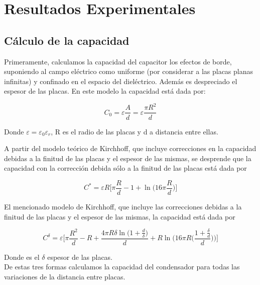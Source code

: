\documentclass{article}
\begin{document}
\section{Resultados Experimentales}

\subsection{Cálculo de la capacidad}
Primeramente, calculamos la capacidad del capacitor los efectos de borde, suponiendo al campo eléctrico como uniforme (por considerar a las 
placas planas infinitas) y confinado en el espacio del dieléctrico. Además es despreciado el espesor de las placas. En este modelo la capacidad está dada por:

\begin{equation}
C_0 = \varepsilon\frac{A}{d} = \varepsilon\frac{\pi R^2}{d}
\end{equation}

Donde $\varepsilon = \varepsilon_0 \varepsilon_r$, R es el radio de las placas y d a 
distancia entre ellas.


A partir del modelo teórico de Kirchhoff, que incluye correcciones en la capacidad debidas a la finitud de las
placas y el espesor de las mismas, se desprende que la capacidad con la corrección debida sólo a la finitud
de las placas está dada por

\begin{equation}
C^{*} = \varepsilon R \bigg[ \pi\frac{R}{d} - 1 + \ln{\bigg(16\pi\frac{R}{d}}\bigg) \bigg]
\end{equation}

El mencionado modelo de Kirchhoff, que incluye las  correcciones debidas a la finitud de las placas y el espesor de las mismas, la capacidad está dada por

\begin{equation} \label{eq:cdelta}
C^{\delta} = \varepsilon \bigg[\pi\frac{R^2}{d} - R + \frac{4 \pi R \delta \ln{\big( 1 + \frac{d}{\delta}\big)}}{d} + R\ln{\bigg(16\pi R\bigg(\frac{1 + \frac{\delta}{d}}{d}}\bigg)\bigg) \bigg]
\end{equation}

Donde es el $\delta$ espesor de las placas.\\

De estas tres formas calculamos la capacidad del condensador para todas las variaciones de la distancia entre placas.

    \begin{table}[H]
	\centering
	
    \end{table}
\end{document}
